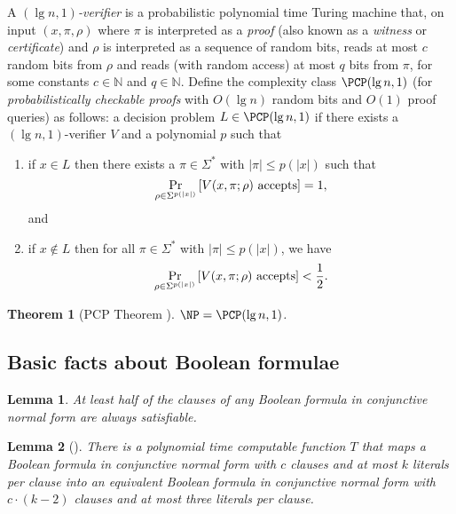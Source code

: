 \documentclass[]{article}
\theoremstyle{plain}
\newtheorem{theorem}{Theorem}
\newtheorem{lemma}{Lemma}
\theoremstyle{definition}
\begin{document}
A \emph{$(\lg n, 1)$-verifier} is a probabilistic polynomial time Turing machine that, on input $(x, \pi, \rho)$ where $\pi$ is interpreted as a \emph{proof} (also known as a \emph{witness} or \emph{certificate}) and $\rho$ is interpreted as a sequence of random bits, reads at most $c$ random bits from $\rho$ and reads (with random access) at most $q$ bits from $\pi$, for some constants $c \in \mathbb{N}$ and $q \in \mathbb{N}$.
Define the complexity class $\PCP(\lg n, 1)$ (for \emph{probabilistically checkable proofs} with $O(\lg n)$ random bits and $O(1)$ proof queries) as follows: a decision problem $L \in \PCP(\lg n, 1)$ if there exists a $(\lg n, 1)$-verifier $V$ and a polynomial $p$ such that
\begin{enumerate}
\item
  if $x \in L$ then there exists a $\pi \in \Sigma^*$ with $|\pi| \leq p(|x|)$ such that
  \begin{displaymath}
    \Pr_{\rho \in \Sigma^{p(|x|)}}\left[V(x, \pi; \rho) \textnormal{ accepts}\right] = 1,
  \end{displaymath}
  and
\item
  if $x \notin L$ then for all $\pi \in \Sigma^*$ with $|\pi| \leq p(|x|)$, we have
  \begin{displaymath}
    \Pr_{\rho \in \Sigma^{p(|x|)}}\left[V(x, \pi; \rho) \textnormal{ accepts}\right] < \frac{1}{2}.
  \end{displaymath}
\end{enumerate}

\begin{theorem}[PCP Theorem \cite{pcp}]\label{thm:pcp}
  $\NP = \PCP(\lg n, 1)$.
\end{theorem}

\subsection{Basic facts about Boolean formulae}

\begin{lemma}\label{lem:half}
 At least half of the clauses of any Boolean formula in conjunctive normal form are always satisfiable.
\end{lemma}

\begin{lemma}[{\cite[Example~6.5]{book}}]\label{lem:three}
  There is a polynomial time computable function $T$ that maps a Boolean formula in conjunctive normal form with $c$ clauses and at most $k$ literals per clause into an equivalent Boolean formula in conjunctive normal form with $c \cdot (k - 2)$ clauses and at most three literals per clause.
\end{lemma}
\end{document}
